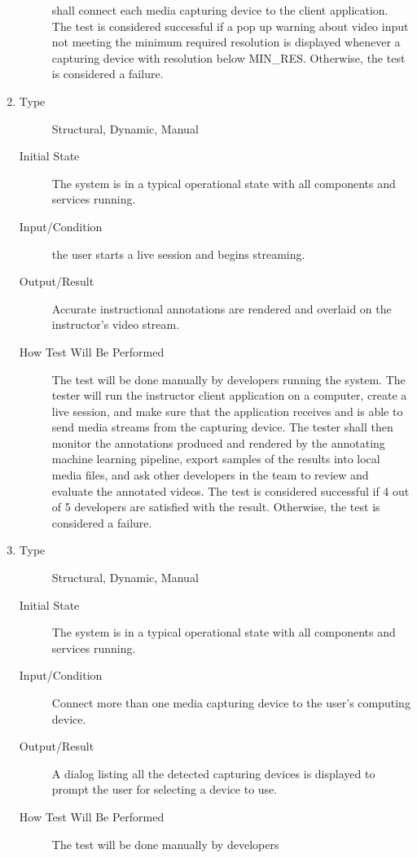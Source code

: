 \documentclass[12pt, titlepage]{article}
\begin{document}
\begin{enumerate}[NFR-T1]
\begin{description}
    shall connect each media capturing device to the client application. The
    test is considered successful if a pop up warning about video input not
    meeting the minimum required resolution is displayed whenever a capturing
    device with resolution below MIN\_RES. Otherwise, the test is
    considered a failure.
  \end{description}
\item \label{NFRT12}
  \begin{description}
  \item[Type] Structural, Dynamic, Manual
  \item[Initial State] The system is in a typical operational state with all
    components and services running.
  \item[Input/Condition] the user starts a live session and begins streaming.
  \item[Output/Result] Accurate instructional annotations are rendered and
    overlaid on the instructor’s video stream.
  \item[How Test Will Be Performed] The test will be done manually by developers
    running the system. The tester will run the instructor client application on
    a computer, create a live session, and make sure that the application
    receives and is able to send media streams from the capturing device. The
    tester shall then monitor the annotations produced and rendered by the
    annotating machine learning pipeline, export samples of the results into
    local media files, and ask other developers in the team to review and
    evaluate the annotated videos. The test is considered successful if 4 out of
    5 developers are satisfied with the result. Otherwise, the test is
    considered a failure.
  \end{description}
\item \label{NFRT13}
  \begin{description}
  \item[Type] Structural, Dynamic, Manual
  \item[Initial State] The system is in a typical operational state with all
    components and services running.
  \item[Input/Condition] Connect more than one media capturing device to the
    user’s computing device.
  \item[Output/Result] A dialog listing all the detected capturing devices is
    displayed to prompt the user for selecting a device to use.
  \item[How Test Will Be Performed] The test will be done manually by developers

\end{description}
\end{enumerate}
\end{document}
